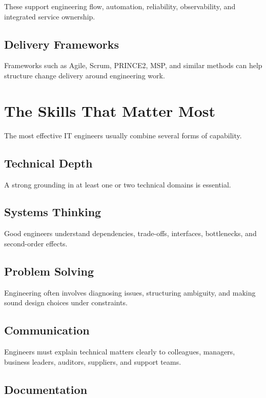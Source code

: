 \documentclass[
  british,
  letterpaper,
  DIV=11,
  numbers=noendperiod]{scrartcl}
\begin{document}
These support engineering flow, automation, reliability, observability,
and integrated service ownership.

\subsection{Delivery Frameworks}\label{delivery-frameworks}

Frameworks such as Agile, Scrum, PRINCE2, MSP, and similar methods can
help structure change delivery around engineering work.

\section{The Skills That Matter Most}\label{the-skills-that-matter-most}

The most effective IT engineers usually combine several forms of
capability.

\subsection{Technical Depth}\label{technical-depth}

A strong grounding in at least one or two technical domains is
essential.

\subsection{Systems Thinking}\label{systems-thinking}

Good engineers understand dependencies, trade-offs, interfaces,
bottlenecks, and second-order effects.

\subsection{Problem Solving}\label{problem-solving}

Engineering often involves diagnosing issues, structuring ambiguity, and
making sound design choices under constraints.

\subsection{Communication}\label{communication}

Engineers must explain technical matters clearly to colleagues,
managers, business leaders, auditors, suppliers, and support teams.

\subsection{Documentation}\label{documentation}
\end{document}
